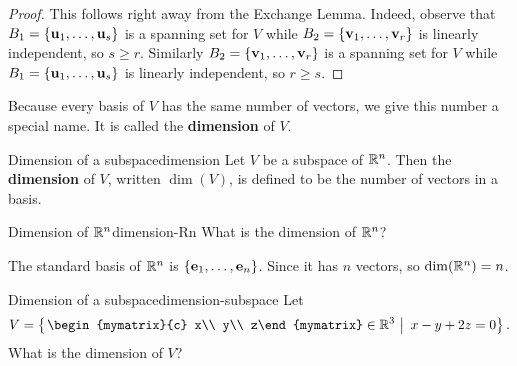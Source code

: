 \begin{proof}
  This follows right away from the Exchange Lemma. Indeed, observe
  that $B_1 = \set{ \vect{u}_{1},\ldots ,\vect{u}_{s}}$ is a spanning
  set for $V$ while $ B_2 = \set{\vect{v}_{1},\ldots,\vect{v}_{r}}$ is
  linearly independent, so $s\geq r$. Similarly
  $B_2 = \set{\vect{v}_{1},\ldots,\vect{v} _{r}} $ is a spanning set
  for $V$ while $B_1 = \set{\vect{u}_{1},\ldots, \vect{u}_{s}}$ is
  linearly independent, so $r\geq s$.
\end{proof}

Because every basis of $V$ has the same number of vectors, we give
this number a special name. It is called the \textbf{dimension} of
$V$.

\begin{definition}{Dimension of a subspace}{dimension}
  Let $V$ be a subspace of\/ $\mathbb{R}^n$. Then the \textbf{dimension}%
   of $V$, written $\dim(V)$, is
  defined to be the number of vectors in a basis.
\end{definition}

\begin{example}{Dimension of\/ $\mathbb{R}^n$}{dimension-Rn}
  What is the dimension of $\mathbb{R}^n$?
\end{example}

\begin{solution}
  The standard basis of $\mathbb{R}^n$ is
  $\set{\vect{e}_{1},\ldots,\vect{e}_{n}}$. Since it has $n$ vectors,
  so $\dim(\mathbb{R}^n) = n$.
\end{solution}

\begin{example}{Dimension of a subspace}{dimension-subspace}
  Let
  \begin{equation*}
    V=\set{\left.
      \begin{mymatrix}{c} x\\ y\\ z\end{mymatrix}\in\R^3 ~\right\vert~
      x-y+2z = 0
    }.
  \end{equation*}
  What is the dimension of\/ $V$?
\end{example}

